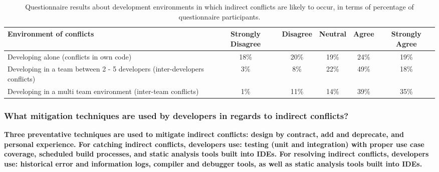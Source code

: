 \begin{table*}[tb!]
\begin{center}
\begin{tabular}{| p{3cm} | c | c | c | c | c |}
\hline
Environment of conflicts & Strongly Disagree & Disagree & Neutral & Agree & Strongly Agree \\
\hline
\hline
Developing alone (conflicts in own code) & 18\% & 20\% & 19\% & 24\% & 19\% \\ \hline
Developing in a team between 2 - 5 developers (inter-developers conflicts) & 3\% & 8\% & 22\% & 49\% & 18\% \\ \hline
Developing in a multi team environment (inter-team conflicts) & 1\% & 11\% & 14\% & 39\% & 35\% \\ \hline
\end{tabular}
\end{center}
\caption{Questionnaire results about development environments in which indirect conflicts are likely to occur, in terms of percentage
of questionnaire participants.\label{tab:env}}
\end{table*}

\subsubsection{What mitigation techniques are used by developers in regards to indirect conflicts?}

\bf{Three preventative techniques are used to mitigate indirect conflicts: design by contract, add and deprecate, and personal
experience. For catching indirect conflicts, developers use: testing (unit and integration) with proper use case coverage,
scheduled build processes, and static analysis tools built into IDEs. For resolving indirect conflicts, developers use: historical
error and information logs, compiler and debugger tools, as well as static analysis tools built into IDEs.}

\normalfont{}

